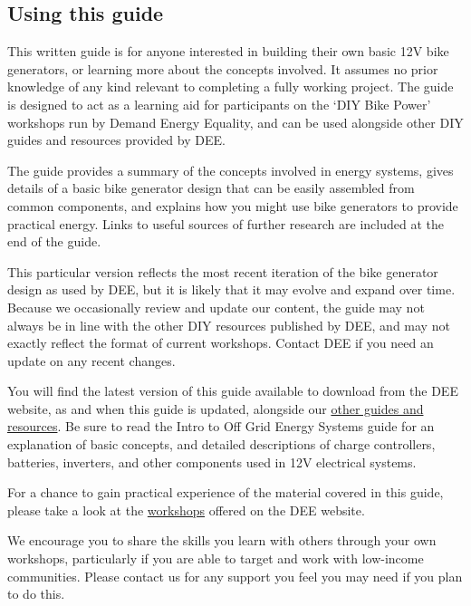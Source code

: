 \documentclass{article}
\theoremstyle{definition}
\theoremstyle{definition}
\theoremstyle{remark}
\begin{document}
  
  \subsection{Using this guide} %
  \label{sub:using_this_guide}

    This written guide is for anyone interested in building their own basic 12V bike generators, or learning more about the concepts involved. It assumes no prior knowledge of any kind relevant to completing a fully working project. The guide is designed to act as a learning aid for participants on the ‘DIY Bike Power’ workshops run by Demand Energy Equality, and can be used alongside other DIY guides and resources provided by DEE. 

    The guide provides a summary of the concepts involved in energy systems, gives details of a basic bike generator design that can be easily assembled from common components, and explains how you might use bike generators to provide practical energy. Links to useful sources of further research are included at the end of the guide.

    This particular version reflects the most recent iteration of the bike generator design as used by DEE, but it is likely that it may evolve and expand over time. Because we occasionally review and update our content, the guide may not always be in line with the other DIY resources published by DEE, and may not exactly reflect the format of current workshops. Contact DEE if you need an update on any recent changes. 
    
    You will find the latest version of this guide available to download from the DEE website, as and when this guide is updated, alongside our \href{https://www.demandenergyequality.org/resources/}{other guides and resources}. Be sure to read the Intro to Off Grid Energy Systems guide for an explanation of basic concepts, and detailed descriptions of charge controllers, batteries, inverters, and other components used in 12V electrical systems.

    For a chance to gain practical experience of the material covered in this guide, please take a look at the \href{https://www.demandenergyequality.org/our-workshops/}{workshops} offered on the DEE website.

    We encourage you to share the skills you learn with others through your own workshops, particularly if you are able to target and work with low-income communities. Please contact us for any support you feel you may need if you plan to do this.
\end{document}
